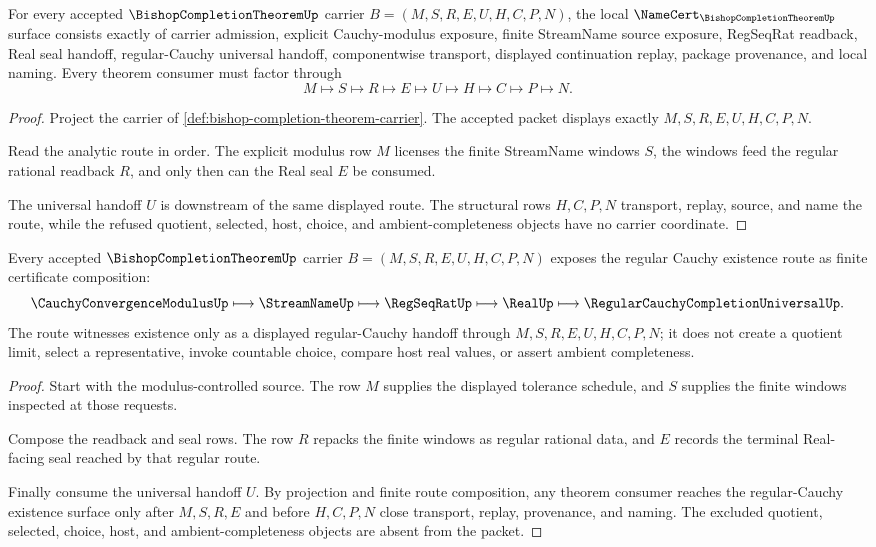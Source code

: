 \begin{theorem}
\label{thm:bishop-completion-theorem-namecert-obligations}
For every accepted $\BishopCompletionTheoremUp$ carrier $B=(M,S,R,E,U,H,C,P,N)$, the local $\NameCert_{\BishopCompletionTheoremUp}$ surface consists exactly of carrier admission, explicit Cauchy-modulus exposure, finite StreamName source exposure, RegSeqRat readback, Real seal handoff, regular-Cauchy universal handoff, componentwise transport, displayed continuation replay, package provenance, and local naming. Every theorem consumer must factor through
$$
M\longmapsto S\longmapsto R\longmapsto E\longmapsto U\longmapsto H\longmapsto C\longmapsto P\longmapsto N.
$$
\end{theorem}
\begin{proof}
Project the carrier of \autoref{def:bishop-completion-theorem-carrier}. The accepted packet displays exactly $M,S,R,E,U,H,C,P,N$.

Read the analytic route in order. The explicit modulus row $M$ licenses the finite StreamName windows $S$, the windows feed the regular rational readback $R$, and only then can the Real seal $E$ be consumed.

The universal handoff $U$ is downstream of the same displayed route. The structural rows $H,C,P,N$ transport, replay, source, and name the route, while the refused quotient, selected, host, choice, and ambient-completeness objects have no carrier coordinate.
\end{proof}

\begin{theorem}
\label{thm:bishop-completion-theorem-regular-cauchy-existence-route}
Every accepted $\BishopCompletionTheoremUp$ carrier $B=(M,S,R,E,U,H,C,P,N)$ exposes the regular Cauchy existence route as finite certificate composition:
$$
\CauchyConvergenceModulusUp\longmapsto\StreamNameUp\longmapsto\RegSeqRatUp\longmapsto\RealUp\longmapsto\RegularCauchyCompletionUniversalUp.
$$
The route witnesses existence only as a displayed regular-Cauchy handoff through $M,S,R,E,U,H,C,P,N$; it does not create a quotient limit, select a representative, invoke countable choice, compare host real values, or assert ambient completeness.
\end{theorem}
\begin{proof}
Start with the modulus-controlled source. The row $M$ supplies the displayed tolerance schedule, and $S$ supplies the finite windows inspected at those requests.

Compose the readback and seal rows. The row $R$ repacks the finite windows as regular rational data, and $E$ records the terminal Real-facing seal reached by that regular route.

Finally consume the universal handoff $U$. By projection and finite route composition, any theorem consumer reaches the regular-Cauchy existence surface only after $M,S,R,E$ and before $H,C,P,N$ close transport, replay, provenance, and naming. The excluded quotient, selected, choice, host, and ambient-completeness objects are absent from the packet.
\end{proof}

